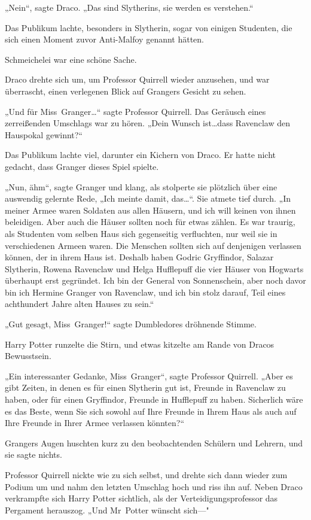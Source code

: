 {„Nein“, sagte Draco. „Das sind Slytherins, sie werden es verstehen.“

Das Publikum lachte, besonders in Slytherin, sogar von einigen Studenten, die sich einen Moment zuvor Anti-Malfoy genannt hätten.

Schmeichelei war eine schöne Sache.

Draco drehte sich um, um Professor Quirrell wieder anzusehen, und war überrascht, einen verlegenen Blick auf Grangers Gesicht zu sehen.

„Und für Miss~Granger…“ sagte Professor Quirrell. Das Geräusch eines zerreißenden Umschlags war zu hören. „Dein Wunsch ist…dass Ravenclaw den Hauspokal gewinnt?“

Das Publikum lachte viel, darunter ein Kichern von Draco. Er hatte nicht gedacht, dass Granger dieses Spiel spielte.

„Nun, ähm“, sagte Granger und klang, als stolperte sie plötzlich über eine auswendig gelernte Rede, „Ich meinte damit, das…“. Sie atmete tief durch. „In meiner Armee waren Soldaten aus allen Häusern, und ich will keinen von ihnen beleidigen. Aber auch die Häuser sollten noch für etwas zählen. Es war traurig, als Studenten vom selben Haus sich gegenseitig verfluchten, nur weil sie in verschiedenen Armeen waren. Die Menschen sollten sich auf denjenigen verlassen können, der in ihrem Haus ist. Deshalb haben Godric Gryffindor, Salazar Slytherin, Rowena Ravenclaw und Helga Hufflepuff die vier Häuser von Hogwarts überhaupt erst gegründet. Ich bin der General von Sonnenschein, aber noch davor bin ich Hermine Granger von Ravenclaw, und ich bin stolz darauf, Teil eines achthundert Jahre alten Hauses zu sein.“

„Gut gesagt, Miss~Granger!“ sagte Dumbledores dröhnende Stimme.

Harry Potter runzelte die Stirn, und etwas kitzelte am Rande von Dracos Bewusstsein.

„Ein interessanter Gedanke, Miss~Granger“, sagte Professor Quirrell. „Aber es gibt Zeiten, in denen es für einen Slytherin gut ist, Freunde in Ravenclaw zu haben, oder für einen Gryffindor, Freunde in Hufflepuff zu haben. Sicherlich wäre es das Beste, wenn Sie sich sowohl auf Ihre Freunde in Ihrem Haus als auch auf Ihre Freunde in Ihrer Armee verlassen könnten?“

Grangers Augen huschten kurz zu den beobachtenden Schülern und Lehrern, und sie sagte nichts.

Professor Quirrell nickte wie zu sich selbst, und drehte sich dann wieder zum Podium um und nahm den letzten Umschlag hoch und riss ihn auf. Neben Draco verkrampfte sich Harry Potter sichtlich, als der Verteidigungsprofessor das Pergament herauszog. „Und Mr~Potter wünscht sich—"

}

